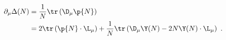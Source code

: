 \begin{equation}
  \label{eq:split}
\begin{split}
  \partial_\mu\Delta(N) &= \frac{1}{N}\tr\left(\D_\mu \p{N}\right)\\*
  &= 2\tr\left(\p{N}\cdot\L_\mu\right)+\frac{1}{N}\tr\left(\D_\mu \Y(N) - 2N
    \Y(N)\cdot\L_\mu\right)\ .
\end{split}  
\end{equation}

